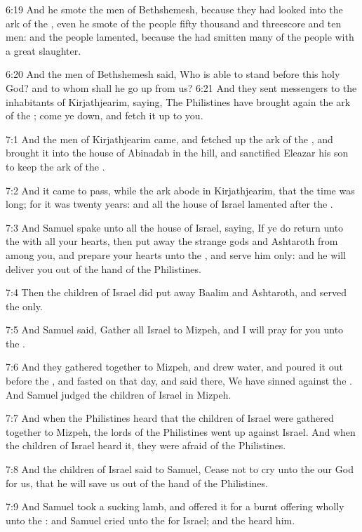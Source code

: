 6:19 And he smote the men of Bethshemesh, because they had looked into the ark of the \LORD, even he smote of the people fifty thousand and threescore and ten men: and the people lamented, because the \LORD had smitten many of the people with a great slaughter.

6:20 And the men of Bethshemesh said, Who is able to stand before this holy \LORD God? and to whom shall he go up from us?  6:21 And they sent messengers to the inhabitants of Kirjathjearim, saying, The Philistines have brought again the ark of the \LORD; come ye down, and fetch it up to you.

7:1 And the men of Kirjathjearim came, and fetched up the ark of the \LORD, and brought it into the house of Abinadab in the hill, and sanctified Eleazar his son to keep the ark of the \LORD.

7:2 And it came to pass, while the ark abode in Kirjathjearim, that the time was long; for it was twenty years: and all the house of Israel lamented after the \LORD.

7:3 And Samuel spake unto all the house of Israel, saying, If ye do return unto the \LORD with all your hearts, then put away the strange gods and Ashtaroth from among you, and prepare your hearts unto the \LORD, and serve him only: and he will deliver you out of the hand of the Philistines.

7:4 Then the children of Israel did put away Baalim and Ashtaroth, and served the \LORD only.

7:5 And Samuel said, Gather all Israel to Mizpeh, and I will pray for you unto the \LORD.

7:6 And they gathered together to Mizpeh, and drew water, and poured it out before the \LORD, and fasted on that day, and said there, We have sinned against the \LORD. And Samuel judged the children of Israel in Mizpeh.

7:7 And when the Philistines heard that the children of Israel were gathered together to Mizpeh, the lords of the Philistines went up against Israel. And when the children of Israel heard it, they were afraid of the Philistines.

7:8 And the children of Israel said to Samuel, Cease not to cry unto the \LORD our God for us, that he will save us out of the hand of the Philistines.

7:9 And Samuel took a sucking lamb, and offered it for a burnt offering wholly unto the \LORD: and Samuel cried unto the \LORD for Israel; and the \LORD heard him.

